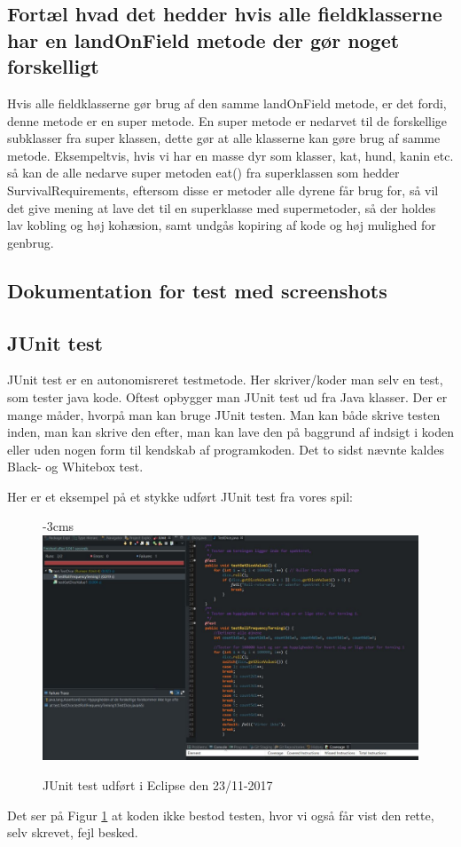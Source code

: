 \subsection{Fortæl hvad det hedder hvis alle fieldklasserne har en landOnField metode der gør noget forskelligt}


Hvis alle fieldklasserne gør brug af den samme landOnField metode, er det fordi, denne metode er en super metode. En super metode er nedarvet til de forskellige subklasser fra super klassen, dette gør at alle klasserne kan gøre brug af samme metode. Eksempeltvis, hvis vi har en masse dyr som klasser, kat, hund, kanin etc. så kan de alle nedarve super metoden eat() fra 
superklassen som hedder SurvivalRequirements, eftersom disse er metoder alle dyrene får brug for, så vil det give mening at lave det til en superklasse med supermetoder, så der holdes lav kobling og høj kohæsion, samt undgås kopiring af kode og høj mulighed for genbrug.

\subsection{Dokumentation for test med screenshots}
    \subsection{JUnit test}
        JUnit test er en autonomisreret testmetode. Her skriver/koder man selv en test, som tester java kode. Oftest opbygger man JUnit test ud fra Java klasser.
        Der er mange måder, hvorpå man kan bruge JUnit testen. Man kan både skrive testen inden, man kan skrive den efter, man kan lave den på baggrund af indsigt i koden eller uden nogen form til kendskab af programkoden. Det to sidst nævnte kaldes Black- og Whitebox test.

        Her er et eksempel på et stykke udført JUnit test fra vores spil:
            \begin{figure}[h]\label{fig:JUnitTest} %
                \advance\leftskip-3cms
                \includegraphics[width=20cm]{fig/JUnitTestDice.jpg}
                \caption{JUnit test udført i Eclipse den 23/11-2017}
            \end{figure}
        Det ser på Figur \ref{fig:JUnitTest} at koden ikke bestod testen, hvor vi også får vist den rette, selv skrevet, fejl besked.

